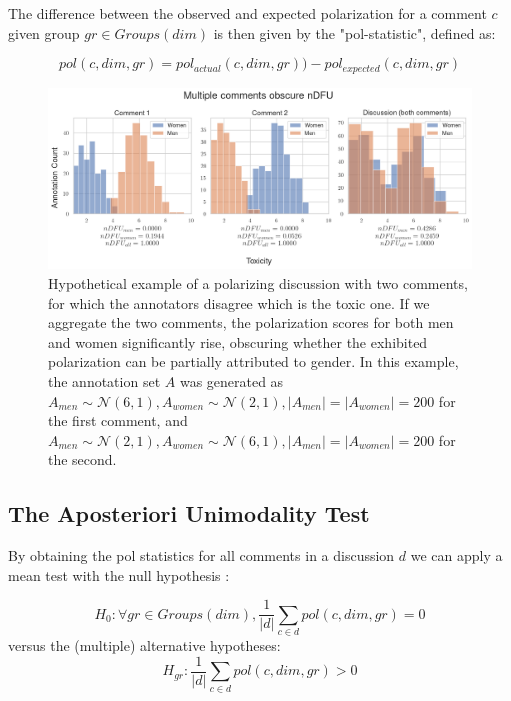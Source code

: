 \documentclass{article}
\newcommand{\sdbdim}{\textit{dim}}
\newcommand{\sdbgroup}{\textit{gr}}
\newcommand{\Sdbgroup}{\textit{Groups}}
\begin{document}
 The difference between the observed and expected polarization for a comment $c$ given group $\sdbgroup \in \Sdbgroup(\sdbdim)$ is then given by the "pol-statistic", defined as: 
 
 \begin{equation}
	\textit{pol}(c, \sdbdim, \sdbgroup)  = pol_{actual}(c, \sdbdim, \sdbgroup)) - pol_{expected}(c, \sdbdim, \sdbgroup)
\end{equation}

\begin{figure}
	\centering
	\includegraphics[width=\linewidth]{ndfu_multi_comments.png}
	\caption{Hypothetical example of a polarizing discussion with two comments, for which the annotators disagree which is the toxic one. If we aggregate the two comments, the polarization scores for both men and women significantly rise, obscuring whether the exhibited polarization can be partially attributed to gender. In this example, the annotation set $A$ was generated as $A_{men} \sim \mathcal{N}(6, 1), A_{women} \sim \mathcal{N}(2, 1), \lvert A_{men} \rvert = \lvert A_{women} \rvert = 200$ for the first comment, and $A_{men} \sim \mathcal{N}(2, 1), A_{women} \sim \mathcal{N}(6, 1), \lvert A_{men} \rvert = \lvert A_{women} \rvert = 200$ for the second.}
	\label{fig:ndfu_multi_comment}
\end{figure}



\subsection{The Aposteriori Unimodality Test}
\label{ssec:methodology:aposteriori}

By obtaining the pol statistics for all comments in a discussion $d$ we can apply a mean test with the null hypothesis :

\begin{equation}
	\label{eq:null_h}
	H_0: \forall \sdbgroup \in \Sdbgroup(\sdbdim), \frac{1}{\lvert d \rvert} \sum\limits_{c \in d} pol(c, \sdbdim,  \sdbgroup) = 0
\end{equation}
\noindent versus the (multiple) alternative hypotheses: 
\begin{equation}
	\label{eq:alt_h}
	H_{\sdbgroup}:\frac{1}{\lvert d \rvert} \sum\limits_{c \in d}  pol(c, \sdbdim, \sdbgroup) >  0
\end{equation}
\end{document}
